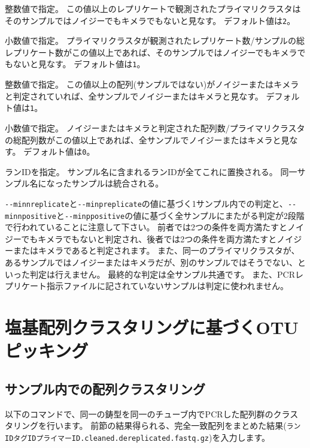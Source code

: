 \documentclass[titlepage,10pt,a4paper]{jsbook}
\begin{document}
\begin{description}\small\setlength{\baselineskip}{1.1em}
\item[\texttt{{-}{-}minnreplicate}] 整数値で指定。
この値以上のレプリケートで観測されたプライマリクラスタはそのサンプルではノイジーでもキメラでもないと見なす。
デフォルト値は\texttt{2}。
\item[\texttt{{-}{-}minpreplicate}] 小数値で指定。
プライマリクラスタが観測されたレプリケート数/サンプルの総レプリケート数がこの値以上であれば、そのサンプルではノイジーでもキメラでもないと見なす。
デフォルト値は\texttt{1}。
\item[\texttt{{-}{-}minnpositive}] 整数値で指定。
この値以上の配列(サンプルではない)がノイジーまたはキメラと判定されていれば、全サンプルでノイジーまたはキメラと見なす。
デフォルト値は\texttt{1}。
\item[\texttt{{-}{-}minppositive}] 小数値で指定。
ノイジーまたはキメラと判定された配列数/プライマリクラスタの総配列数がこの値以上であれば、全サンプルでノイジーまたはキメラと見なす。
デフォルト値は\texttt{0}。
\item[\texttt{{-}{-}runname}] ランIDを指定。
サンプル名に含まれるランIDが全てこれに置換される。
同一サンプル名になったサンプルは統合される。
\end{description}

\texttt{{-}{-}minnreplicate}と\texttt{{-}{-}minpreplicate}の値に基づく1サンプル内での判定と、\texttt{{-}{-}minnpositive}と\texttt{{-}{-}minppositive}の値に基づく全サンプルにまたがる判定が2段階で行われていることに注意して下さい。
前者では2つの条件を両方満たすとノイジーでもキメラでもないと判定され、後者では2つの条件を両方満たすとノイジーまたはキメラであると判定されます。
また、同一のプライマリクラスタが、あるサンプルではノイジーまたはキメラだが、別のサンプルではそうでない、といった判定は行えません。
最終的な判定は全サンプル共通です。
また、PCRレプリケート指示ファイルに記されていないサンプルは判定に使われません。

\section{塩基配列クラスタリングに基づくOTUピッキング}

\subsection{サンプル内での配列クラスタリング}

以下のコマンドで、同一の鋳型を同一のチューブ内でPCRした配列群のクラスタリングを行います。
前節の結果得られる、完全一致配列をまとめた結果(\texttt{ランID{\textunderscore}{\textunderscore}タグID{\textunderscore}{\textunderscore}プライマーID.cleaned.dereplicated.fastq.gz})を入力します。
\end{document}
